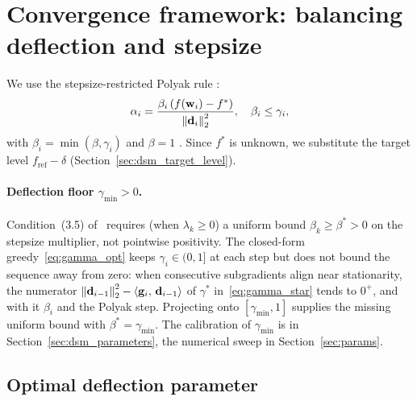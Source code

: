 \section{Convergence framework: balancing deflection and stepsize}
\label{sec:dsm_convergence_conditions}

We use the stepsize-restricted Polyak rule \cite[Slide 15]{frangioni-slides-nonsmooth}:
\begin{equation}\label{eq:sr_step}
\alpha_i = \frac{\beta_i\,(f(\mathbf{w}_i) - f^*)}{\left\lVert \mathbf{d}_i \right\rVert_2^2}, \quad \beta_i \leq \gamma_i,
\end{equation}
with $\beta_i = \min(\beta,\gamma_i)$ and $\beta = 1$ \cite[Slide 14]{frangioni-slides-nonsmooth}. Since $f^*$ is unknown, we substitute the target level $f_{\mathrm{ref}} - \delta$ (Section~\ref{sec:dsm_target_level}).

\paragraph{Deflection floor $\gamma_{\min} > 0$.}
Condition~(3.5) of~\cite{dantonio2009deflected} requires (when $\lambda_k \ge 0$) a uniform bound $\beta_k \ge \beta^* > 0$ on the stepsize multiplier, not pointwise positivity. The closed-form greedy~\eqref{eq:gamma_opt} keeps $\gamma_i \in (0,1]$ at each step but does not bound the sequence away from zero: when consecutive subgradients align near stationarity, the numerator $\left\lVert \mathbf{d}_{i-1} \right\rVert_2^2 - \left\langle \mathbf{g}_i,\, \mathbf{d}_{i-1} \right\rangle$ of $\gamma^{*}$ in~\eqref{eq:gamma_star} tends to $0^+$, and with it $\beta_i$ and the Polyak step. Projecting onto $[\gamma_{\min}, 1]$ supplies the missing uniform bound with $\beta^* = \gamma_{\min}$. The calibration of $\gamma_{\min}$ is in Section~\ref{sec:dsm_parameters}, the numerical sweep in Section~\ref{sec:params}.

\subsection{Optimal deflection parameter}
\label{sec:dsm_optimal_gamma}

